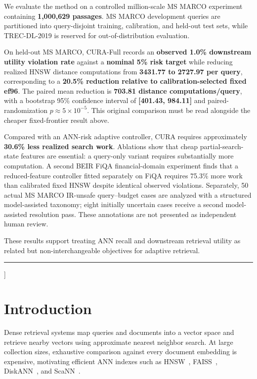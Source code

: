 \documentclass[10pt,twocolumn]{article}
\newcommand{\cura}{CURA}
\begin{document}
\begin{@twocolumnfalse}
\begin{minipage}{0.97\textwidth}
We evaluate the method on a controlled million-scale MS MARCO experiment containing \textbf{1,000,629 passages}. MS MARCO development queries are partitioned into query-disjoint training, calibration, and held-out test sets, while TREC-DL-2019 is reserved for out-of-distribution evaluation.

On held-out MS MARCO, \cura{}-Full records an \textbf{observed 1.0\% downstream utility violation rate} against a \textbf{nominal 5\% risk target} while reducing realized HNSW distance computations from \textbf{3431.77 to 2727.97 per query}, corresponding to a \textbf{20.5\% reduction relative to calibration-selected fixed ef96}. The paired mean reduction is \textbf{703.81 distance computations/query}, with a bootstrap 95\% confidence interval of \textbf{[401.43, 984.11]} and paired-randomization \textbf{$p\approx5\times10^{-5}$}. This original comparison must be read alongside the cheaper fixed-frontier result above.

Compared with an ANN-risk adaptive controller, \cura{} requires approximately \textbf{30.6\% less realized search work}. Ablations show that cheap partial-search-state features are essential: a query-only variant requires substantially more computation. A second BEIR FiQA financial-domain experiment finds that a reduced-feature controller fitted separately on FiQA requires 75.3\% more work than calibrated fixed HNSW despite identical observed violations. Separately, 50 actual MS MARCO IR-unsafe query--budget cases are analyzed with a structured model-assisted taxonomy; eight initially uncertain cases receive a second model-assisted resolution pass. These annotations are not presented as independent human review.

These results support treating ANN recall and downstream retrieval utility as related but non-interchangeable objectives for adaptive retrieval.
\end{minipage}
\vspace{0.10cm}
\noindent\rule{\textwidth}{0.65pt}
\vspace{0.35cm}
\end{@twocolumnfalse}
]

\section{Introduction}
\label{sec:introduction}
Dense retrieval systems map queries and documents into a vector space and retrieve nearby vectors using approximate nearest neighbor search. At large collection sizes, exhaustive comparison against every document embedding is expensive, motivating efficient ANN indexes such as HNSW~\citep{malkov2020hnsw}, FAISS~\citep{johnson2017faiss}, DiskANN~\citep{subramanya2019diskann}, and ScaNN~\citep{guo2020scann}.
\end{document}
